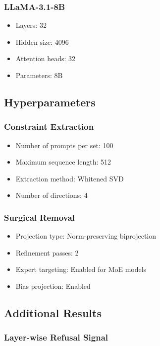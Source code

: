 \subsubsection{LLaMA-3.1-8B}
\begin{itemize}
    \item Layers: 32
    \item Hidden size: 4096
    \item Attention heads: 32
    \item Parameters: 8B
\end{itemize}

\subsection{Hyperparameters}

\subsubsection{Constraint Extraction}
\begin{itemize}
    \item Number of prompts per set: 100
    \item Maximum sequence length: 512
    \item Extraction method: Whitened SVD
    \item Number of directions: 4
\end{itemize}

\subsubsection{Surgical Removal}
\begin{itemize}
    \item Projection type: Norm-preserving biprojection
    \item Refinement passes: 2
    \item Expert targeting: Enabled for MoE models
    \item Bias projection: Enabled
\end{itemize}

\subsection{Additional Results}

\subsubsection{Layer-wise Refusal Signal}

